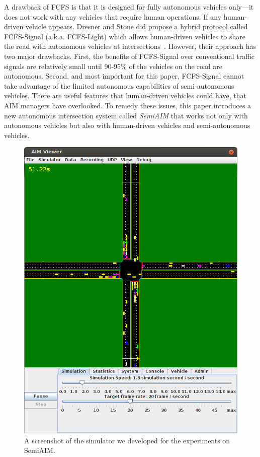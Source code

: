 A drawback of FCFS is that it is designed for fully autonomous
vehicles only---it does not work with any vehicles that require human
operations. If any human-driven vehicle appears. Dresner and Stone did
propose a hybrid protocol called FCFS-Signal (a.k.a. FCFS-Light) which
allows human-driven vehicles to share the road with autonomous
vehicles at intersections~\cite{bib:Dresner07Sharing}. However, their
approach has two major drawbacks.  First, the benefits of FCFS-Signal
over conventional traffic signals are relatively small until 90-95\%
of the vehicles on the road are autonomous.  Second, and most
important for this paper, FCFS-Signal cannot take advantage of the
limited autonomous capabilities of semi-autonomous vehicles. There are
useful features that human-driven vehicles could have, that AIM
managers have overlooked. To remedy these issues, this paper
introduces a new autonomous intersection system called \emph{SemiAIM}
that works not only with autonomous vehicles but also with
human-driven vehicles and semi-autonomous vehicles.


\begin{figure}
\centering
\includegraphics[width=0.8\columnwidth]{figures/demo.png}
\caption{A screenshot of the simulator we developed for the experiments on
SemiAIM.}
\label{fig:simulator}
\end{figure}





